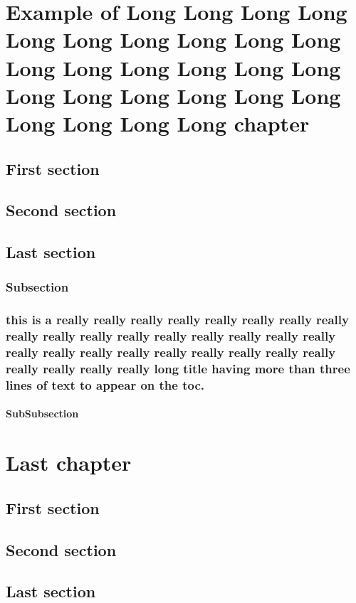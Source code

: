 \documentclass{mines-thesis}
\begin{document}
\chapter{Example of Long  Long Long Long Long Long Long Long Long Long Long Long Long Long Long Long Long Long Long Long Long Long Long Long Long Long chapter}
\lipsum[1-10]

\section{First section} \lipsum[2-3]
\section{Second section} \lipsum[4-5]
\section{Last section} \lipsum[6-7]
\subsection{Subsection}
\lipsum[4-5]
\subsection{this is a really really really really really really really really really really really really really really really really really really really really really really really really really really really really really really long title having more than three lines of text to appear on the toc.}
\subsubsection{SubSubsection}
\lipsum[1]
\chapter{Last chapter} \lipsum[1]
\section{First section} \lipsum[2-3]
\section{Second section} \lipsum[4-5]
\section{Last section} \lipsum[6-7]
\end{document}
